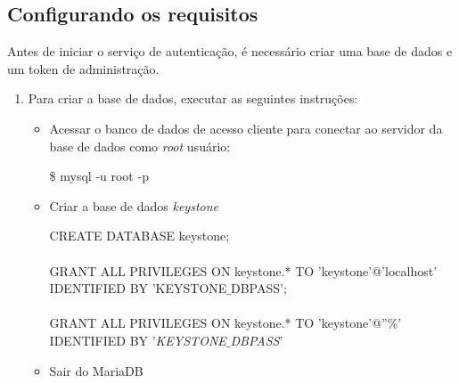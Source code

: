 	\subsection{Configurando os requisitos}
	Antes de iniciar o serviço de autenticação, é necessário criar uma base de dados e um token de administração.\\
	\begin{enumerate}
	
		\item Para criar a base de dados, executar as seguintes instruções:
		\begin{itemize}
			\item Acessar o banco de dados de acesso cliente para conectar ao servidor da base de dados como \emph{root} usuário:
			\begin{snugshade}
				\$ mysql -u root -p
			\end{snugshade}
			
			\item Criar a base de dados \emph{keystone}
			\begin{snugshade}
				CREATE DATABASE keystone; \\ \\
				GRANT ALL PRIVILEGES ON keystone.* TO 'keystone'@'localhost' IDENTIFIED BY 'KEYSTONE$\_$DBPASS'; \\ \\
				GRANT ALL PRIVILEGES ON keystone.* TO 'keystone'@''\%' IDENTIFIED BY '\emph{KEYSTONE$\_$DBPASS}'
			\end{snugshade}			
			\item Sair do MariaDB
		\end{itemize}
	\end{enumerate}
	
